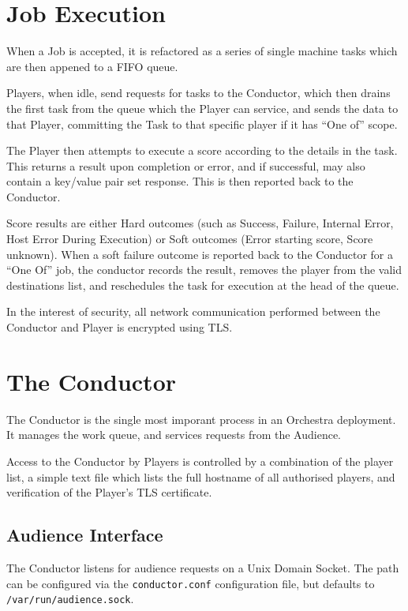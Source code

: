 \documentclass[a4paper]{article}
\begin{document}
\section{Job Execution}

When a Job is accepted, it is refactored as a series of single machine
tasks which are then appened to a FIFO queue.

Players, when idle, send requests for tasks to the Conductor, which
then drains the first task from the queue which the Player can
service, and sends the data to that Player, committing the Task to
that specific player if it has ``One of'' scope.

The Player then attempts to execute a score according to the details
in the task.  This returns a result upon completion or error, and if
successful, may also contain a key/value pair set response.  This is
then reported back to the Conductor.

Score results are either Hard outcomes (such as Success, Failure,
Internal Error, Host Error During Execution) or Soft outcomes (Error
starting score, Score unknown).  When a soft failure outcome is
reported back to the Conductor for a ``One Of'' job, the conductor
records the result, removes the player from the valid destinations
list, and reschedules the task for execution at the head of the queue.

In the interest of security, all network communication performed
between the Conductor and Player is encrypted using TLS.

\section{The Conductor}

The Conductor is the single most imporant process in an Orchestra
deployment.  It manages the work queue, and services requests from the
Audience.

Access to the Conductor by Players is controlled by a combination of
the player list, a simple text file which lists the full hostname of
all authorised players, and verification of the Player's TLS
certificate.

\subsection{Audience Interface}

The Conductor listens for audience requests on a Unix Domain Socket.
The path can be configured via the {\tt conductor.conf} configuration
file, but defaults to {\tt /var/run/audience.sock}.
\end{document}
